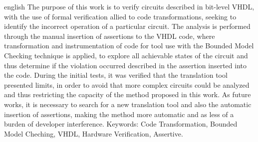 \begin{otherlanguage*}{english}
The purpose of this work is to verify circuits described in bit-level VHDL, with the use of formal verification allied to code transformations, seeking to identify the incorrect operation of a particular circuit. The analysis is performed through the manual insertion of assertions to the VHDL code, where transformation and instrumentation of code for tool use with the Bounded Model Checking technique is applied, to explore all achievable states of the circuit and thus determine if the violation occurred described in the assertion inserted into the code. During the initial tests, it was verified that the translation tool presented limits, in order to avoid that more complex circuits could be analyzed and thus restricting the capacity of the method proposed in this work. As future works, it is necessary to search for a new translation tool and also the automatic insertion of assertions, making the method more automatic and as less of a burden of developer interference.
\vspace {\onelineskip}
\noindent
\pair
Keywords: Code Transformation, Bounded Model Cheching, VHDL, Hardware Verification, Assertive.
\end{otherlanguage*}